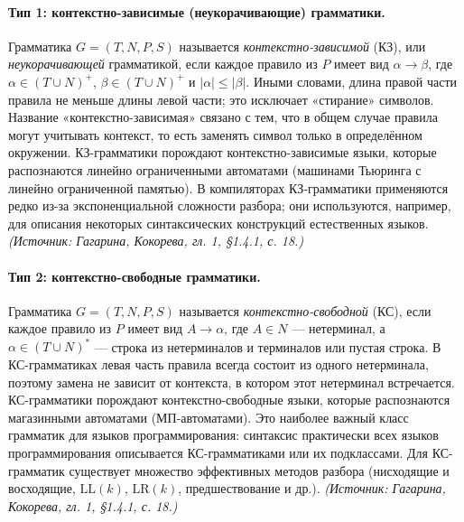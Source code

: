 \documentclass[a4paper,12pt]{article}
\begin{document}
\paragraph{Тип 1: контекстно-зависимые (неукорачивающие) грамматики.}
Грамматика \(G=(T,N,P,S)\) называется \emph{контекстно-зависимой} (КЗ), или \emph{неукорачивающей} грамматикой, если каждое правило из \(P\) имеет вид \(\alpha\to\beta\), где \(\alpha\in(T\cup N)^+\), \(\beta\in(T\cup N)^+\) и \(|\alpha|\le|\beta|\). Иными словами, длина правой части правила не меньше длины левой части; это исключает «стирание» символов. Название «контекстно-зависимая» связано с тем, что в общем случае правила могут учитывать контекст, то есть заменять символ только в определённом окружении. КЗ-грамматики порождают контекстно-зависимые языки, которые распознаются линейно ограниченными автоматами (машинами Тьюринга с линейно ограниченной памятью). В компиляторах КЗ-грамматики применяются редко из-за экспоненциальной сложности разбора; они используются, например, для описания некоторых синтаксических конструкций естественных языков.
\textit{(Источник: Гагарина, Кокорева, гл. 1, §1.4.1, с. 18.)}

\paragraph{Тип 2: контекстно-свободные грамматики.}
Грамматика \(G=(T,N,P,S)\) называется \emph{контекстно-свободной} (КС), если каждое правило из \(P\) имеет вид \(A\to\alpha\), где \(A\in N\) — нетерминал, а \(\alpha\in(T\cup N)^*\) — строка из нетерминалов и терминалов или пустая строка. В КС-грамматиках левая часть правила всегда состоит из одного нетерминала, поэтому замена не зависит от контекста, в котором этот нетерминал встречается. КС-грамматики порождают контекстно-свободные языки, которые распознаются магазинными автоматами (МП-автоматами). Это наиболее важный класс грамматик для языков программирования: синтаксис практически всех языков программирования описывается КС-грамматиками или их подклассами. Для КС-грамматик существует множество эффективных методов разбора (нисходящие и восходящие, \(\mathrm{LL}(k)\), \(\mathrm{LR}(k)\), предшествование и др.).
\textit{(Источник: Гагарина, Кокорева, гл. 1, §1.4.1, с. 18.)}
\end{document}
